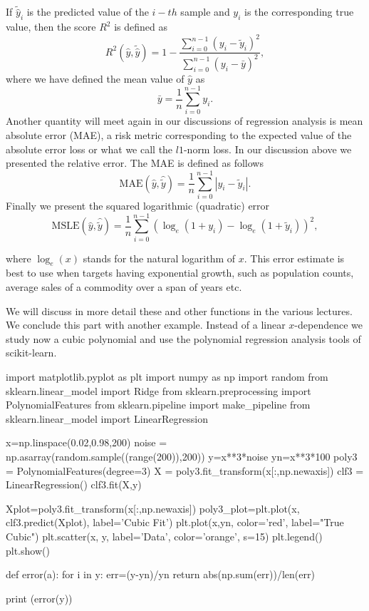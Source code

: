 \documentclass[%
oneside,                 %
final,                   %
10pt]{article}
\begin{document}
If $\tilde{\hat{y}}_i$ is the predicted value of the $i-th$ sample and $y_i$ is the corresponding true value, then the score $R^2$ is defined as
\[
R^2(\hat{y}, \tilde{\hat{y}}) = 1 - \frac{\sum_{i=0}^{n - 1} (y_i - \tilde{y}_i)^2}{\sum_{i=0}^{n - 1} (y_i - \bar{y})^2},
\]
where we have defined the mean value  of $\hat{y}$ as
\[
\bar{y} =  \frac{1}{n} \sum_{i=0}^{n - 1} y_i.
\]
Another quantity will meet again in our discussions of regression analysis is 
 mean absolute error (MAE), a risk metric corresponding to the expected value of the absolute error loss or what we call the $l1$-norm loss. In our discussion above we presented the relative error.
The MAE is defined as follows
\[
\text{MAE}(\hat{y}, \hat{\tilde{y}}) = \frac{1}{n} \sum_{i=0}^{n-1} \left| y_i - \tilde{y}_i \right|.
\]
Finally we present the 
squared logarithmic (quadratic) error
\[
\text{MSLE}(\hat{y}, \hat{\tilde{y}}) = \frac{1}{n} \sum_{i=0}^{n - 1} (\log_e (1 + y_i) - \log_e (1 + \tilde{y}_i) )^2,
\]

where $\log_e (x)$ stands for the natural logarithm of $x$. This error
estimate is best to use when targets having exponential growth, such
as population counts, average sales of a commodity over a span of
years etc. 

We will discuss in more
detail these and other functions in the various lectures.  We conclude this part with another example. Instead of 
a linear $x$-dependence we study now a cubic polynomial and use the polynomial regression analysis tools of scikit-learn. 

\bpycod
import matplotlib.pyplot as plt
import numpy as np
import random
from sklearn.linear_model import Ridge
from sklearn.preprocessing import PolynomialFeatures
from sklearn.pipeline import make_pipeline
from sklearn.linear_model import LinearRegression

x=np.linspace(0.02,0.98,200)
noise = np.asarray(random.sample((range(200)),200))
y=x**3*noise
yn=x**3*100
poly3 = PolynomialFeatures(degree=3)
X = poly3.fit_transform(x[:,np.newaxis])
clf3 = LinearRegression()
clf3.fit(X,y)

Xplot=poly3.fit_transform(x[:,np.newaxis])
poly3_plot=plt.plot(x, clf3.predict(Xplot), label='Cubic Fit')
plt.plot(x,yn, color='red', label="True Cubic")
plt.scatter(x, y, label='Data', color='orange', s=15)
plt.legend()
plt.show()

def error(a):
    for i in y:
        err=(y-yn)/yn
    return abs(np.sum(err))/len(err)

print (error(y))
\epycod
\end{document}
